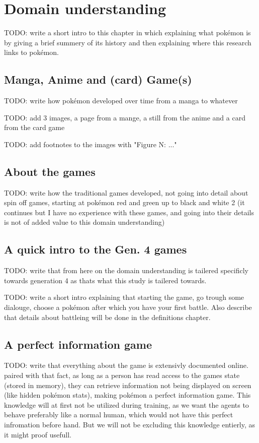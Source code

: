 \chapter{Domain understanding}

TODO: write a short intro to this chapter in which explaining what pokémon is by giving a brief summery of its history and then explaining where this research links to pokémon. 

\section{Manga, Anime and (card) Game(s)}

TODO: write how pokémon developed over time from a manga to whatever

TODO: add 3 images, a page from a mange, a still from the anime and a card from the card game

TODO: add footnotes to the images with "Figure N: ..."

\section{About the games}

TODO: write how the traditional games developed, not going into detail about spin off games, starting at pokémon red and green up to black and white 2 (it continues but I have no experience with these games, and going into their details is not of added value to this domain understanding)

\section{A quick intro to the Gen. 4 games}

TODO: write that from here on the domain understanding is tailered specificly towards generation 4 as thats what this study is tailered towards.

TODO: write a short intro explaining that starting the game, go trough some dialouge, choose a pokémon after which you have your first battle. Also describe that details about battleing will be done in the definitions chapter.

\section{A perfect information game}

TODO: write that everything about the game is extensivly documented online. paired with that fact, as long as a person has read access to the games state (stored in memory), they can retrieve information not being displayed on screen (like hidden pokémon stats), making pokémon a perfect information game. This knowledge will at first not be utilized during training, as we want the agents to behave preferably like a normal human, which would not have this perfect infromation before hand. But we will not be excluding this knowledge entierly, as it might proof usefull.

